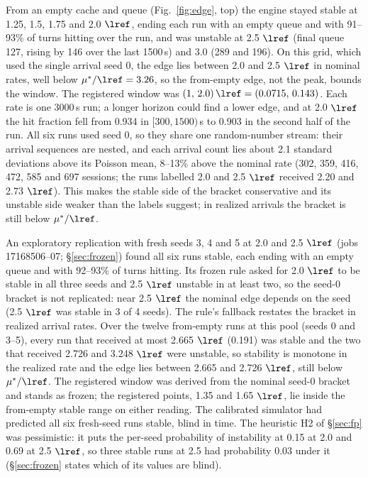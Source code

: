 From an empty cache and queue (Fig.~\ref{fig:edge}, top) the engine stayed stable at 1.25, 1.5, 1.75 and 2.0 $\lref$, ending each run with an empty queue and with 91--93\% of turns hitting over the run, and was unstable at 2.5 $\lref$ (final queue 127, rising by 146 over the last 1500\,s) and 3.0 (289 and 196). On this grid, which used the single arrival seed 0, the edge lies between 2.0 and 2.5 $\lref$ in nominal rates, well below $\mu^*/\lref=3.26$, so the from-empty edge, not the peak, bounds the window. The registered window was $(1,\,2.0)\,\lref=(0.0715,\,0.143)$\sps. Each rate is one 3000\,s run; a longer horizon could find a lower edge, and at 2.0 $\lref$ the hit fraction fell from 0.934 in $[300,1500)$\,s to 0.903 in the second half of the run. All six runs used seed 0, so they share one random-number stream: their arrival sequences are nested, and each arrival count lies about 2.1 standard deviations above its Poisson mean, 8--13\% above the nominal rate (302, 359, 416, 472, 585 and 697 sessions; the runs labelled 2.0 and 2.5 $\lref$ received 2.20 and 2.73 $\lref$). This makes the stable side of the bracket conservative and its unstable side weaker than the labels suggest; in realized arrivals the bracket is still below $\mu^*/\lref$.

An exploratory replication with fresh seeds 3, 4 and 5 at 2.0 and 2.5 $\lref$ (jobs 17168506--07; \S\ref{sec:frozen}) found all six runs stable, each ending with an empty queue and with 92--93\% of turns hitting. Its frozen rule asked for 2.0 $\lref$ to be stable in all three seeds and 2.5 $\lref$ unstable in at least two, so the seed-0 bracket is not replicated: near 2.5 $\lref$ the nominal edge depends on the seed (2.5 $\lref$ was stable in 3 of 4 seeds). The rule's fallback restates the bracket in realized arrival rates. Over the twelve from-empty runs at this pool (seeds 0 and 3--5), every run that received at most 2.665 $\lref$ (0.191\sps) was stable and the two that received 2.726 and 3.248 $\lref$ were unstable, so stability is monotone in the realized rate and the edge lies between 2.665 and 2.726 $\lref$, still below $\mu^*/\lref$. The registered window was derived from the nominal seed-0 bracket and stands as frozen; the registered points, 1.35 and 1.65 $\lref$, lie inside the from-empty stable range on either reading. The calibrated simulator had predicted all six fresh-seed runs stable, blind in time. The heuristic H2 of \S\ref{sec:fp} was pessimistic: it puts the per-seed probability of instability at 0.15 at 2.0 and 0.69 at 2.5 $\lref$, so three stable runs at 2.5 had probability 0.03 under it (\S\ref{sec:frozen} states which of its values are blind).

